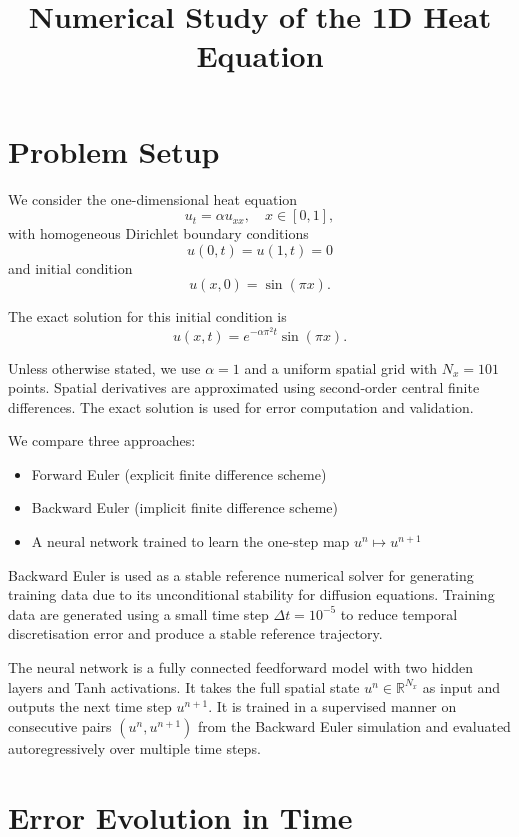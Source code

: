 \documentclass[11pt]{article}
\title{Numerical Study of the 1D Heat Equation}
\author{}
\date{}
\begin{document}
\maketitle

\section{Problem Setup}

We consider the one-dimensional heat equation
\[
u_t = \alpha u_{xx}, \quad x \in [0,1],
\]
with homogeneous Dirichlet boundary conditions
\[
u(0,t)=u(1,t)=0
\]
and initial condition
\[
u(x,0)=\sin(\pi x).
\]

The exact solution for this initial condition is
\[
u(x,t)=e^{-\alpha \pi^2 t}\sin(\pi x).
\]

Unless otherwise stated, we use $\alpha = 1$ and a uniform spatial grid with $N_x = 101$ points. Spatial derivatives are approximated using second-order central finite differences. The exact solution is used for error computation and validation.

We compare three approaches:
\begin{itemize}
    \item Forward Euler (explicit finite difference scheme)
    \item Backward Euler (implicit finite difference scheme)
    \item A neural network trained to learn the one-step map $u^n \mapsto u^{n+1}$
\end{itemize}

Backward Euler is used as a stable reference numerical solver for generating training data due to its unconditional stability for diffusion equations. Training data are generated using a small time step $\Delta t = 10^{-5}$ to reduce temporal discretisation error and produce a stable reference trajectory.

The neural network is a fully connected feedforward model with two hidden layers and Tanh activations. It takes the full spatial state $u^n \in \mathbb{R}^{N_x}$ as input and outputs the next time step $u^{n+1}$. It is trained in a supervised manner on consecutive pairs $(u^n, u^{n+1})$ from the Backward Euler simulation and evaluated autoregressively over multiple time steps.

\section{Error Evolution in Time}
\end{document}
